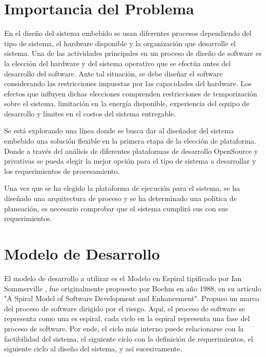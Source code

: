 \section{Importancia del Problema}

En el diseño del sistema embebido se usan diferentes procesos dependiendo del tipo de sistema, el hardware disponible y la organización que
desarrolle el sistema. Una de las actividades principales en un proceso de diseño de software es la elección del hardware y del sistema operativo que
se efectúa antes del desarrollo del software. Ante tal situación, se debe diseñar el software considerando las restricciones impuestas por las
capacidades del hardware.
Los efectos que influyen dichas elecciones comprenden restricciones de temporización sobre el sistema, limitación en la energía disponible,
experiencia del equipo de desarrollo y límites en el costos del sistema entregable.
 
Se está explorando una línea donde se busca dar al diseñador del sistema embebido una solución flexible en la primera etapa de la elección de
plataforma. Donde a través del análisis de diferentes plataformas de desarrollo OpenSource y privativas se pueda elegir la mejor opción para el tipo
de sistema a desarrollar y los requerimientos de procesamiento.
 
Una vez que se ha elegido la plataforma de ejecución para el sistema, se ha diseñado una arquitectura de proceso y se ha determinado una política de
planeación, es necesario comprobar que el sistema cumplirá sus con sus requerimientos.

\section{Modelo de Desarrollo}

El modelo de desarrollo a utilizar es el Modelo en Espiral tipificado por Ian Sommerville\cite{Etiqueta00}%
, fue originalmente propuesto por Boehm en año 1988, en su artículo "A Spiral Model of Software Development and Enhancement". Propuso un
marco del proceso de software dirigido por el riesgo. Aquí, el proceso de software se representa como una es espiral, cada ciclo en la espiral
representa una fase del proceso de software. Por ende, el ciclo más interno puede relacionarse con la factibilidad del sistema, el siguiente ciclo
con la definición de requerimientos, el siguiente ciclo al diseño del sistema, y así sucesivamente. %

